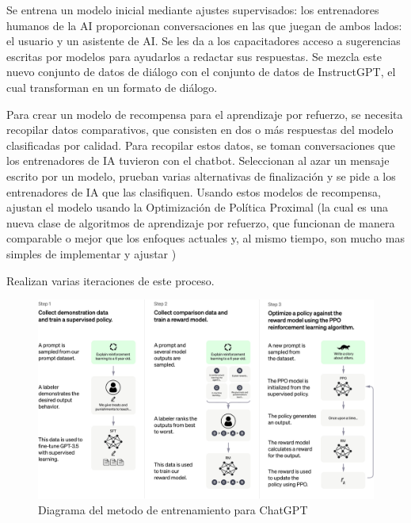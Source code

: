 \documentclass[runningheads]{llncs} %
\begin{document}
Se entrena un modelo inicial mediante ajustes supervisados: los entrenadores humanos
de la AI proporcionan conversaciones en las que juegan de ambos lados: el usuario
y un asistente de AI. Se les da a los capacitadores acceso a sugerencias escritas
por modelos para ayudarlos a redactar sus respuestas. 
Se mezcla este nuevo conjunto de datos de diálogo con el conjunto de datos de InstructGPT, 
el cual transforman en un formato de diálogo. \cite{ej-chatgpt}

Para crear un modelo de recompensa para el aprendizaje por refuerzo, 
se necesita recopilar datos comparativos, que consisten en dos o más respuestas 
del modelo clasificadas por calidad. Para recopilar estos datos, se toman conversaciones 
que los entrenadores de IA tuvieron con el chatbot. Seleccionan al azar un mensaje 
escrito por un modelo, prueban varias alternativas de finalización y se pide a los 
entrenadores de IA que las clasifiquen. Usando estos modelos de recompensa, 
ajustan el modelo usando la Optimización de Política Proximal (la cual es
una nueva clase de algoritmos de aprendizaje por refuerzo, que funcionan de manera
comparable o mejor que los enfoques actuales y, al mismo tiempo, son mucho mas
simples de implementar y ajustar \cite{def-PPO})

Realizan varias iteraciones de este proceso. \cite{ej-chatgpt}

\begin{figure}
    \centering
    \includegraphics[scale=0.4]{ChatGPT_Diagram.jpg}
    \caption{Diagrama del metodo de entrenamiento
    para ChatGPT \cite{ej-chatgpt}}
    \label{fig:chatgpt-diagrama}
\end{figure}

\end{document}
